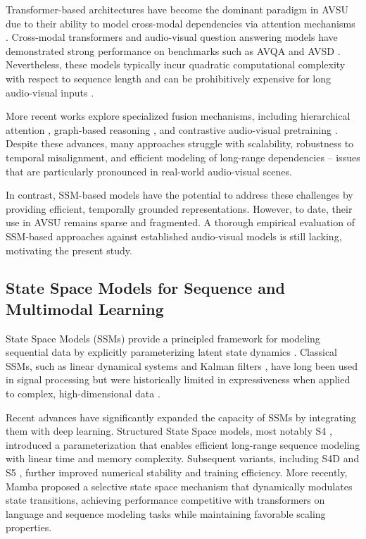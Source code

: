 \documentclass[a4paper,12pt]{extarticle}
\begin{document}
Transformer-based architectures have become the dominant paradigm in AVSU due to their ability to model cross-modal dependencies via attention mechanisms \cite{zorro2023, maavt2025, tsam2025}. Cross-modal transformers \cite{zorro2023, revisitingAVSeg2025} and audio-visual question answering models \cite{li2024cat, maavt2025} have demonstrated strong performance on benchmarks such as AVQA \cite{yang2022avqa} and AVSD \cite{alamri2019audio}. Nevertheless, these models typically incur quadratic computational complexity with respect to sequence length \cite{vaswani2017attention} and can be prohibitively expensive for long audio-visual inputs \cite{hou2024lfav, maavt2024}.

More recent works explore specialized fusion mechanisms, including hierarchical attention \cite{vamsidhar2025, wang2023hierarchicalAV}, graph-based reasoning \cite{liu2025AVSGN, zhao2024heterogeneousGraph}, and contrastive audio-visual pretraining \cite{manzoor2023multimodality, attendFusion2408}. Despite these advances, many approaches struggle with scalability, robustness to temporal misalignment, and efficient modeling of long-range dependencies -- issues that are particularly pronounced in real-world audio-visual scenes.

In contrast, SSM-based models have the potential to address these challenges by providing efficient, temporally grounded representations. However, to date, their use in AVSU remains sparse and fragmented. A thorough empirical evaluation of SSM-based approaches against established audio-visual models is still lacking, motivating the present study.

\subsection{State Space Models for Sequence and Multimodal Learning}

State Space Models (SSMs) provide a principled framework for modeling sequential data by explicitly parameterizing latent state dynamics \cite{kalman1960new}. Classical SSMs, such as linear dynamical systems and Kalman filters \cite{kalman1960new}, have long been used in signal processing but were historically limited in expressiveness when applied to complex, high-dimensional data \cite{roweis2002unifying, linderman2017bayesian}.

Recent advances have significantly expanded the capacity of SSMs by integrating them with deep learning. Structured State Space models, most notably S4 \cite{gu2021s4}, introduced a parameterization that enables efficient long-range sequence modeling with linear time and memory complexity. Subsequent variants, including S4D \cite{s4d2022parameterization} and S5 \cite{smith2022s5}, further improved numerical stability and training efficiency. More recently, Mamba \cite{dao2024mamba} proposed a selective state space mechanism that dynamically modulates state transitions, achieving performance competitive with transformers on language and sequence modeling tasks while maintaining favorable scaling properties.
\end{document}
